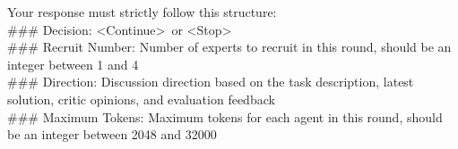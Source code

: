 \begin{tcolorbox}[
  title=CEO Prompts,
  breakable,
  colback=white,
  colframe=black
]
Your response must strictly follow this structure: \\
\#\#\# Decision: \textless Continue\textgreater\ or \textless Stop\textgreater\ \\
\#\#\# Recruit Number: Number of experts to recruit in this round, should be an integer between 1 and 4 \\
\#\#\# Direction: Discussion direction based on the task description, latest solution, critic opinions, and evaluation feedback \\
\#\#\# Maximum Tokens: Maximum tokens for each agent in this round, should be an integer between 2048 and 32000 \\

\end{tcolorbox}





